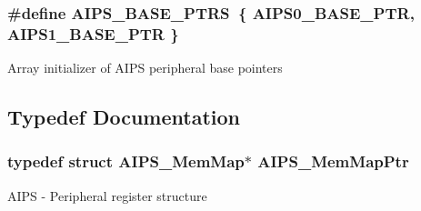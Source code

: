 \subsubsection[{A\+I\+P\+S\+\_\+\+B\+A\+S\+E\+\_\+\+P\+T\+R\+S}]{\setlength{\rightskip}{0pt plus 5cm}\#define A\+I\+P\+S\+\_\+\+B\+A\+S\+E\+\_\+\+P\+T\+R\+S~\{ {\bf A\+I\+P\+S0\+\_\+\+B\+A\+S\+E\+\_\+\+P\+T\+R}, {\bf A\+I\+P\+S1\+\_\+\+B\+A\+S\+E\+\_\+\+P\+T\+R} \}}\label{group___a_i_p_s___peripheral_gacdda032ccd174e1d8c1a02b1e0f7a441}
Array initializer of A\+I\+P\+S peripheral base pointers 

\subsection{Typedef Documentation}
\hypertarget{group___a_i_p_s___peripheral_ga6a37456f1049f1d08787b6ffe1c8a9b3}{}
\subsubsection[{A\+I\+P\+S\+\_\+\+Mem\+Map\+Ptr}]{\setlength{\rightskip}{0pt plus 5cm}typedef struct {\bf A\+I\+P\+S\+\_\+\+Mem\+Map}$\ast$ {\bf A\+I\+P\+S\+\_\+\+Mem\+Map\+Ptr}}\label{group___a_i_p_s___peripheral_ga6a37456f1049f1d08787b6ffe1c8a9b3}
A\+I\+P\+S -\/ Peripheral register structure 